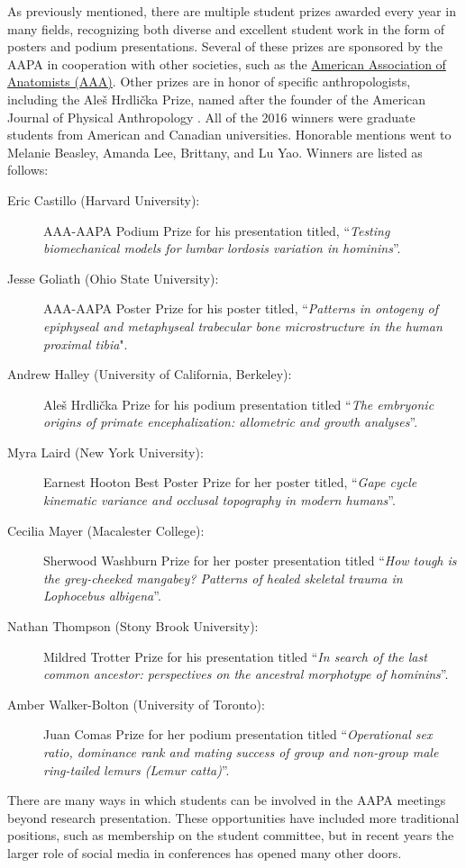 As previously mentioned, there are multiple student prizes awarded every year in many fields,
recognizing both diverse and excellent student work in the form of posters and podium presentations. 
Several of these prizes are sponsored by the AAPA in cooperation with other societies,
such as the \href{http://www.anatomy.org/}{American Association of Anatomists (AAA)}. 
Other prizes are in honor of specific anthropologists, including the Aleš Hrdlička Prize,
named after the founder of the American Journal of Physical Anthropology \parencite{american}.
All of the 2016 winners were graduate students from American and Canadian universities. 
Honorable mentions went to Melanie Beasley, Amanda Lee, Brittany, and Lu Yao.  
Winners are listed as follows: 
\begin{description}
  \item[Eric Castillo (Harvard University):] AAA-AAPA Podium Prize for his presentation titled, “\emph{Testing biomechanical models for lumbar lordosis variation in hominins}”.
  \item[Jesse Goliath (Ohio State University):] AAA-AAPA Poster Prize for his poster titled, “\emph{Patterns in ontogeny of epiphyseal and metaphyseal trabecular bone microstructure in the human proximal tibia}".
  \item[Andrew Halley (University of California, Berkeley):] Aleš Hrdlička Prize for his podium presentation titled “\emph{The embryonic origins of primate encephalization: allometric and growth analyses}”.
  \item[Myra Laird (New York University):] Earnest Hooton Best Poster Prize for her poster titled, “\emph{Gape cycle kinematic variance and occlusal topography in modern humans}”.
  \item[Cecilia Mayer (Macalester College):] Sherwood Washburn Prize for her poster presentation titled “\emph{How tough is the grey-cheeked mangabey? Patterns of healed skeletal trauma in \emph{Lophocebus albigena}}”.
  \item[Nathan Thompson (Stony Brook University):] Mildred Trotter Prize for his presentation titled “\emph{In search of the last common ancestor: perspectives on the ancestral morphotype of hominins}”.
  \item[Amber Walker-Bolton (University of Toronto):] Juan Comas Prize for her podium presentation titled “\emph{Operational sex ratio, dominance rank and mating success of group and non-group male ring-tailed lemurs \emph{(Lemur catta)}}”.
\end{description}
There  are many ways in which students can be involved in the AAPA meetings beyond research presentation.  These opportunities have included more traditional positions, such as membership on the student committee, but in recent years the larger role of social media in conferences has opened many other doors.  

